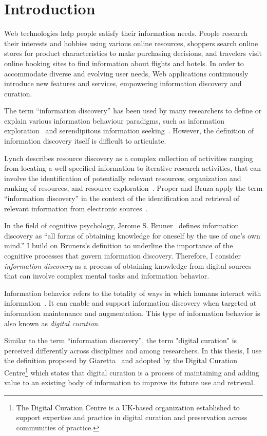 \chapter{Introduction}
\label{chapter:chapter_intro}

Web technologies help people satisfy their information needs. People research their interests and hobbies using various online resources, shoppers search online stores for product characteristics to make purchasing decisions, and travelers visit online booking sites to find information about flights and hotels. In order to accommodate diverse and evolving user needs, Web applications continuously introduce new features and services, empowering information discovery and curation. 

The term ``information discovery'' has been used by many researchers to define or explain various information behaviour paradigms, such as information exploration~\cite{waterworth1991model} and serendipitous information seeking~\cite{foster2003serendipity}. However, the definition of information discovery itself is difficult to articulate. 

Lynch describes resource discovery as a complex collection of activities ranging from locating a well-specified information to iterative research activities, that can involve the identification
of potentially relevant resources, organization and ranking of resources, and resource exploration~\cite{lynch1995networked}. Proper and Bruza apply the term ``information discovery'' in the context of  the identification and retrieval of relevant information from electronic sources~\cite{proper1999information}. 

In the field of cognitive psychology, Jerome S. Bruner~\cite{bruner1961act} defines information discovery as ``all forms of obtaining knowledge for oneself by the use of one's own mind.'' I build on Bruners's definition to underline the importance of the cognitive processes that govern information discovery. Therefore, I consider \textit{information discovery} as a process of obtaining knowledge from digital sources that can involve complex mental tasks and information behavior.  

Information behavior refers to the totality of ways in which humans interact with information~\cite{wilson2000human}. It can enable and support information discovery when targeted at information maintenance and augmentation. This type of information behavior is also known as \textit{digital curation}.

Similar to the term ``information discovery'', the term "digital curation" is perceived differently across disciplines and among researchers. In this thesis, I use the definition proposed by Giaretta~\cite{giaretta2006dcc} and adopted by the Digital Curation Centre\footnote{The Digital Curation Centre is a UK-based organization established to support expertise and practice in digital curation and preservation across communities of practice.} which states that digital curation is a process of maintaining and adding value to an existing body of information to improve its future use and retrieval.   

